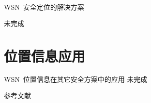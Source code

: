 \documentclass[mathserif,compress,CJKutf8, red]{beamer}
\begin{document}
\begin{CJK*}{UTF8}{song}
\begin{frame}{WSN~安全定位的解决方案}

未完成
\end{frame}

\section{位置信息应用}

\begin{frame}{WSN~位置信息在其它安全方案中的应用}
未完成
\end{frame}

\begin{frame}{参考文献}


\end{frame}
\end{CJK*}
\end{document}
